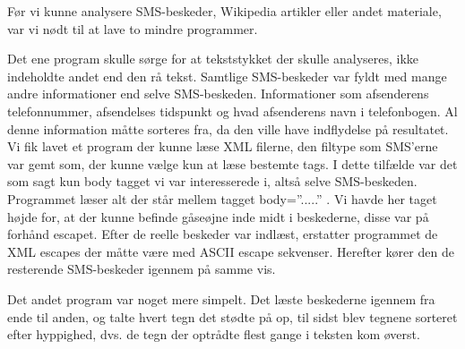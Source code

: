 \label{SmaaProg}
Før vi kunne analysere SMS-beskeder, Wikipedia artikler eller andet materiale, var vi nødt til at lave to mindre programmer.

Det ene program skulle sørge for at tekststykket der skulle analyseres, ikke indeholdte andet end den rå tekst. Samtlige SMS-beskeder var fyldt med mange andre informationer end selve SMS-beskeden. Informationer som afsenderens telefonnummer, afsendelses tidspunkt og hvad afsenderens navn i telefonbogen. Al denne information måtte sorteres fra, da den ville have indflydelse på resultatet. Vi fik lavet et program der kunne læse XML filerne, den filtype som SMS’erne var gemt som, der kunne vælge kun at læse bestemte tags. I dette tilfælde var det som sagt kun body tagget vi var interesserede i, altså selve SMS-beskeden. Programmet læser alt der står mellem tagget body=”.....” . Vi havde her taget højde for, at der kunne befinde gåseøjne inde midt i beskederne, disse var på forhånd escapet. Efter de reelle beskeder var indlæst, erstatter programmet de XML escapes der måtte være med ASCII escape sekvenser. Herefter kører den de resterende SMS-beskeder igennem på samme vis.

Det andet program var noget mere simpelt. Det læste beskederne igennem fra ende til anden, og talte hvert tegn det stødte på op, til sidst blev tegnene sorteret efter hyppighed, dvs. de tegn der optrådte flest gange i teksten kom øverst.
